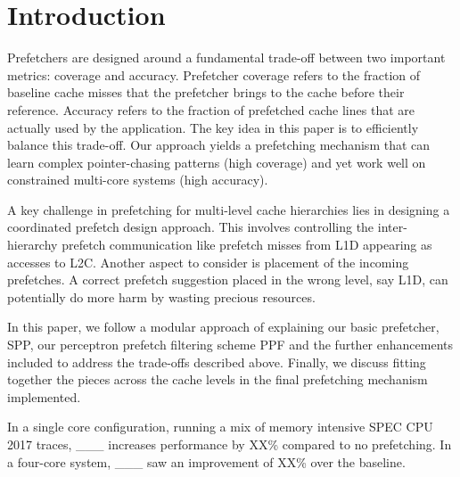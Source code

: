 \section{Introduction}
\label{Introduction}

Prefetchers are designed around a fundamental trade-off between two
important metrics: coverage and accuracy. Prefetcher coverage refers
to the fraction of baseline cache misses that the prefetcher brings to
the cache before their reference. Accuracy refers to the fraction of
prefetched cache lines that are actually used by the application. The
key idea in this paper is to efficiently balance this trade-off. Our
approach yields a prefetching mechanism that can learn complex
pointer-chasing patterns (high coverage) and yet work well on
constrained multi-core systems (high accuracy).

A key challenge in prefetching for multi-level cache hierarchies lies
in designing a coordinated prefetch design approach.  This involves
controlling the inter-hierarchy prefetch communication like prefetch
misses from L1D appearing as accesses to L2C.  Another aspect to
consider is placement of the incoming prefetches.  A correct prefetch
suggestion placed in the wrong level, say L1D, can potentially do more
harm by wasting precious resources.

In this paper, we follow a modular approach of explaining our basic
prefetcher, SPP, our perceptron prefetch filtering scheme PPF and the
further enhancements included to address the trade-offs described
above.  Finally, we discuss fitting together the pieces across the
cache levels in the final prefetching mechanism implemented.

In a single core configuration, running a mix of memory intensive SPEC
CPU 2017 traces, \_\_\_ increases performance by XX\% compared to no
prefetching.  In a four-core system, \_\_\_ saw an improvement of XX\%
over the baseline.

